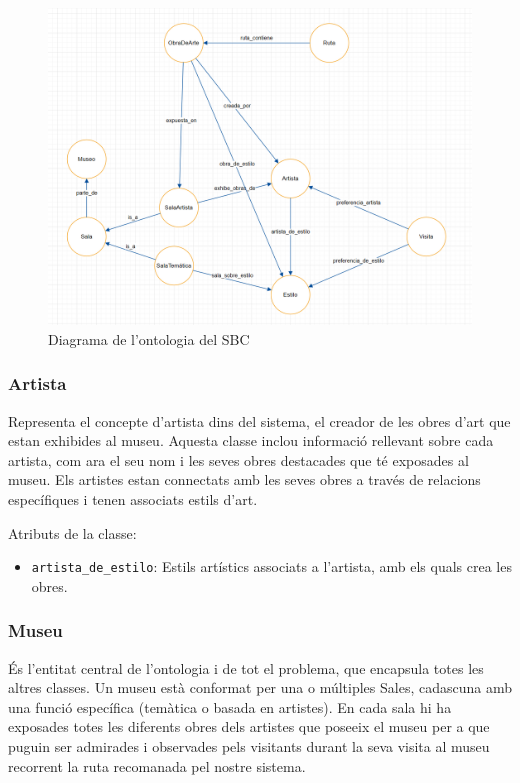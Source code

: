 \documentclass[a4paper]{article}
\begin{document}
	\begin{figure}[H]
		\centering
		\includegraphics[width=0.75\linewidth]{images/ontologia.png}
		\caption{Diagrama de l'ontologia del SBC}
	\end{figure}
	
	\subsubsection*{Artista}
	Representa el concepte d'artista dins del sistema, el creador de les obres d'art que estan exhibides al museu. Aquesta classe inclou informació rellevant sobre cada artista, com ara el seu nom i les seves obres destacades que té exposades al museu. Els artistes estan connectats amb les seves obres a través de relacions específiques i tenen associats estils d'art.
	
	Atributs de la classe:
	\begin{itemize}
		\item \texttt{artista\_de\_estilo}: Estils artístics associats a l’artista, amb els quals crea les obres.
	\end{itemize}
	
	
	\subsubsection*{Museu}
	És l'entitat central de l'ontologia i de tot el problema, que encapsula totes les altres classes. Un museu està conformat per una o múltiples Sales, cadascuna amb una funció específica (temàtica o basada en artistes). En cada sala hi ha exposades totes les diferents obres dels artistes que poseeix el museu per a que puguin ser admirades i observades pels visitants durant la seva visita al museu recorrent la ruta recomanada pel nostre sistema.
	
\end{document}
